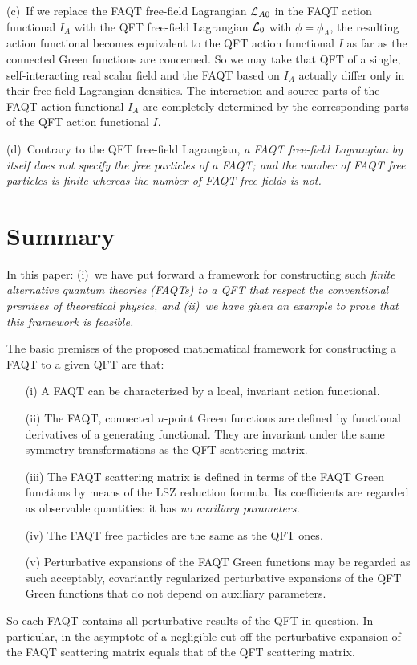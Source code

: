 \documentclass[a4paper,12pt]{article}
\newcommand{\polje}{\phi}
\newcommand{\polA}{\polje_A}
\newcommand{\akcija}{I}
\newcommand{\akcijaA}{\akcija_A}
\newcommand{\Lag}{{\cal L}}
\newcommand{\Lagf}{\Lag_{0}}
\newcommand{\LagAf}{\Lag_{A0}}
\begin{document}
(c)~If we replace the FAQT free-field Lagrangian $\LagAf$ in the FAQT action functional $\akcijaA$ with the QFT  free-field Lagrangian $\Lagf$ with $\polje=\polA$, the resulting action functional becomes equivalent to the QFT action functional $\akcija$ as far as the connected Green functions are concerned. So we may take that QFT of a single, self-interacting real scalar field and the FAQT based on $\akcijaA$ actually differ only in their free-field Lagrangian densities. The interaction and source parts of the FAQT action functional $\akcijaA$ are completely determined by the corresponding parts of the QFT action functional $\akcija$.

(d)~Contrary to the QFT free-field Lagrangian, \it a FAQT free-field Lagrangian by itself does not specify the free particles of a FAQT; \rm and the number of FAQT free particles is finite whereas the number of FAQT free fields is not.

\section{Summary}
\label{secsummary}

In this paper: (i)~we have put forward a framework for constructing such \it finite alternative quantum theories \rm (FAQTs) to a QFT that respect \it the conventional premises of theoretical physics, \rm and (ii)~we have given an example to prove that this framework is feasible.

The basic premises of the proposed mathematical framework for constructing a FAQT to a given QFT are that:
\begin{itemize}
\item[(i)]A FAQT can be characterized by a local, invariant action functional.
\item[(ii)]The FAQT, connected $n$-point Green functions are defined by functional derivatives of a generating functional. They are invariant under the same symmetry transformations as the QFT scattering matrix.
\item[(iii)]The FAQT scattering matrix is defined in terms of the FAQT Green functions by means of the LSZ reduction formula. Its coefficients are regarded as observable quantities: it has \it no auxiliary parameters. \rm
\item[(iv)]The FAQT free particles are the same as the QFT ones.
\item[(v)]Perturbative expansions of the FAQT Green functions may be regarded as such acceptably, covariantly regularized perturbative expansions of the QFT Green functions that do not depend on auxiliary parameters.
\end{itemize}
So each FAQT contains all perturbative results of the QFT in question. In particular, in the asymptote of a negligible cut-off the perturbative expansion of the FAQT scattering matrix equals that of the QFT scattering matrix.
\end{document}

